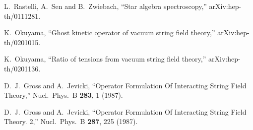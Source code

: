 \documentclass[a4paper,12pt]{article}
\begin{document}
\begin{thebibliography}{10}
L.~Rastelli, A.~Sen and B.~Zwiebach,
``Star algebra spectroscopy,''
arXiv:hep-th/0111281.

K.~Okuyama,
``Ghost kinetic operator of vacuum string field theory,''
arXiv:hep-th/0201015.

K.~Okuyama,
``Ratio of tensions from vacuum string field theory,''
arXiv:hep-th/0201136.

D.~J.~Gross and A.~Jevicki,
``Operator Formulation Of Interacting String Field Theory,''
Nucl.\ Phys.\ B {\bf 283}, 1 (1987).

D.~J.~Gross and A.~Jevicki,
``Operator Formulation Of Interacting String Field Theory. 2,''
Nucl.\ Phys.\ B {\bf 287}, 225 (1987).

\end{thebibliography}\endgroup
\end{document}
